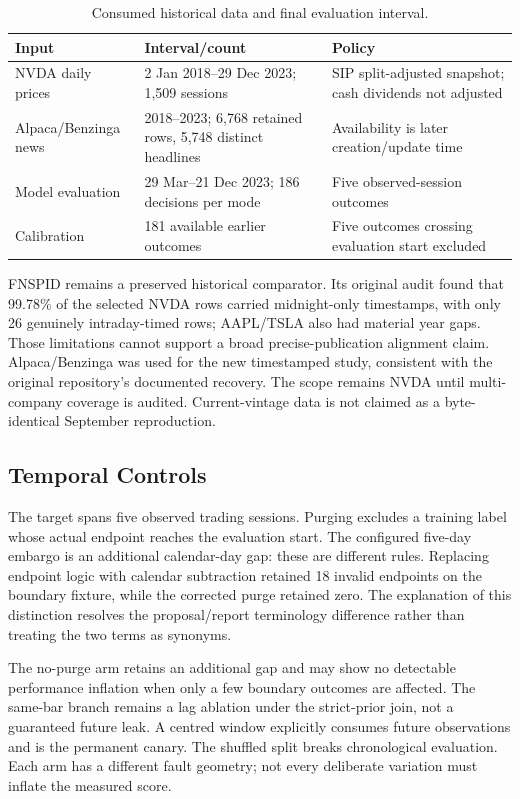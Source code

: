 \begin{longtable}{p{}p{}p{}}
\caption{Consumed historical data and final evaluation interval.}\label{tab:data-interval}\\\toprule Input & Interval/count & Policy\\\midrule
NVDA daily prices & 2 Jan 2018--29 Dec 2023; 1,509 sessions & SIP split-adjusted snapshot; cash dividends not adjusted\\
Alpaca/Benzinga news & 2018--2023; 6,768 retained rows, 5,748 distinct headlines & Availability is later creation/update time\\
Model evaluation & 29 Mar--21 Dec 2023; 186 decisions per mode & Five observed-session outcomes\\
Calibration & 181 available earlier outcomes & Five outcomes crossing evaluation start excluded\\
\bottomrule\end{longtable}
FNSPID remains a preserved historical comparator. Its original audit found that 99.78\% of the selected NVDA rows carried midnight-only timestamps, with only 26 genuinely intraday-timed rows; AAPL/TSLA also had material year gaps. Those limitations cannot support a broad precise-publication alignment claim. Alpaca/Benzinga was used for the new timestamped study, consistent with the original repository's documented recovery. The scope remains NVDA until multi-company coverage is audited. Current-vintage data is not claimed as a byte-identical September reproduction.

\subsection{Temporal Controls}

The target spans five observed trading sessions. Purging excludes a training label whose actual endpoint reaches the evaluation start. The configured five-day embargo is an additional calendar-day gap: these are different rules. Replacing endpoint logic with calendar subtraction retained 18 invalid endpoints on the boundary fixture, while the corrected purge retained zero. The explanation of this distinction resolves the proposal/report terminology difference rather than treating the two terms as synonyms.

The no-purge arm retains an additional gap and may show no detectable performance inflation when only a few boundary outcomes are affected. The same-bar branch remains a lag ablation under the strict-prior join, not a guaranteed future leak. A centred window explicitly consumes future observations and is the permanent canary. The shuffled split breaks chronological evaluation. Each arm has a different fault geometry; not every deliberate variation must inflate the measured score.

